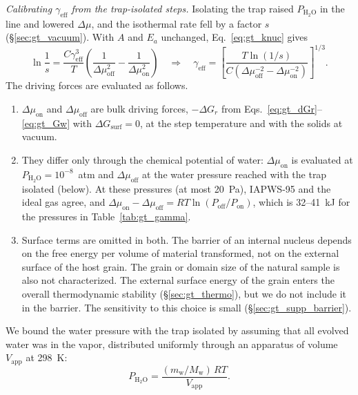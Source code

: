 \textit{Calibrating $\gamma_{\mathrm{eff}}$ from the trap-isolated steps.} Isolating the trap
raised $P_{\mathrm{H_2O}}$ in the line and lowered $\Delta\mu$, and the isothermal rate fell by a factor
$s$ (\S\ref{sec:gt_vacuum}). With $A$ and $E_a$ unchanged, Eq.~\eqref{eq:gt_knuc} gives
\begin{equation}
  \ln\frac{1}{s} = \frac{C\gamma_{\mathrm{eff}}^{3}}{T}\left(\frac{1}{\Delta\mu_{\mathrm{off}}^{2}} - \frac{1}{\Delta\mu_{\mathrm{on}}^{2}}\right)
  \quad\Longrightarrow\quad
  \gamma_{\mathrm{eff}} = \left[\frac{T\ln(1/s)}{C\left(\Delta\mu_{\mathrm{off}}^{-2} - \Delta\mu_{\mathrm{on}}^{-2}\right)}\right]^{1/3}.
  \label{eq:gt_gamma_cal}
\end{equation}
The driving forces are evaluated as follows.
\begin{enumerate}
  \item $\Delta\mu_{\mathrm{on}}$ and $\Delta\mu_{\mathrm{off}}$ are bulk driving forces,
  $-\Delta G_r$ from Eqs.~\eqref{eq:gt_dGr}--\eqref{eq:gt_Gw} with $\Delta G_{\mathrm{surf}} = 0$, at the
  step temperature and with the solids at vacuum.
  \item They differ only through the chemical potential of water: $\Delta\mu_{\mathrm{on}}$ is
  evaluated at $P_{\mathrm{H_2O}} = 10^{-8}$~atm and $\Delta\mu_{\mathrm{off}}$ at the water pressure
  reached with the trap isolated (below). At these pressures (at most 20~Pa), IAPWS-95 and the
  ideal gas agree, and
  $\Delta\mu_{\mathrm{on}} - \Delta\mu_{\mathrm{off}} = RT\ln(P_{\mathrm{off}}/P_{\mathrm{on}})$, which is
  32--41~kJ for the pressures in Table~\ref{tab:gt_gamma}.
  \item Surface terms are omitted in both. The barrier of an internal nucleus depends on the free
  energy per volume of material transformed, not on the external surface of the host grain. The
  grain or domain size of the natural sample is also not characterized. The external surface
  energy of the grain enters the overall thermodynamic stability (\S\ref{sec:gt_thermo}),
  but we do not include it in the barrier. The sensitivity to this choice is small
  (\S\ref{sec:gt_supp_barrier}).
\end{enumerate}
We bound the water pressure with the trap isolated by assuming that all evolved water was in the
vapor, distributed uniformly through an apparatus of volume $V_{\mathrm{app}}$ at 298~K:
\begin{equation}
  P_{\mathrm{H_2O}} = \frac{(m_{\mathrm{w}}/M_{\mathrm{w}})\,RT}{V_{\mathrm{app}}} .
\end{equation}
